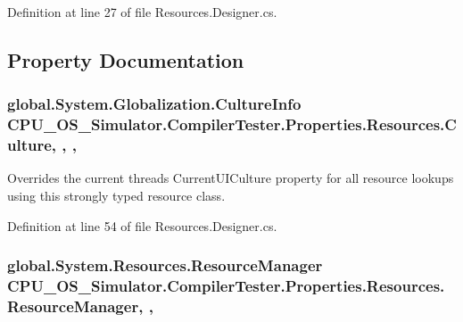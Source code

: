 Definition at line 27 of file Resources.\+Designer.\+cs.



\subsection{Property Documentation}
\hypertarget{class_c_p_u___o_s___simulator_1_1_compiler_tester_1_1_properties_1_1_resources_a807802b7b284da0be79ea3aa4402dca8}{}
\subsubsection[{Culture}]{\setlength{\rightskip}{0pt plus 5cm}global.\+System.\+Globalization.\+Culture\+Info C\+P\+U\+\_\+\+O\+S\+\_\+\+Simulator.\+Compiler\+Tester.\+Properties.\+Resources.\+Culture\hspace{0.3cm}{\ttfamily [static]}, {\ttfamily [get]}, {\ttfamily [set]}, {\ttfamily [package]}}\label{class_c_p_u___o_s___simulator_1_1_compiler_tester_1_1_properties_1_1_resources_a807802b7b284da0be79ea3aa4402dca8}


Overrides the current thread\textquotesingle{}s Current\+U\+I\+Culture property for all resource lookups using this strongly typed resource class. 



Definition at line 54 of file Resources.\+Designer.\+cs.

\hypertarget{class_c_p_u___o_s___simulator_1_1_compiler_tester_1_1_properties_1_1_resources_acded12adee371e9156c9eb76d6517b54}{}
\subsubsection[{Resource\+Manager}]{\setlength{\rightskip}{0pt plus 5cm}global.\+System.\+Resources.\+Resource\+Manager C\+P\+U\+\_\+\+O\+S\+\_\+\+Simulator.\+Compiler\+Tester.\+Properties.\+Resources.\+Resource\+Manager\hspace{0.3cm}{\ttfamily [static]}, {\ttfamily [get]}, {\ttfamily [package]}}\label{class_c_p_u___o_s___simulator_1_1_compiler_tester_1_1_properties_1_1_resources_acded12adee371e9156c9eb76d6517b54}


